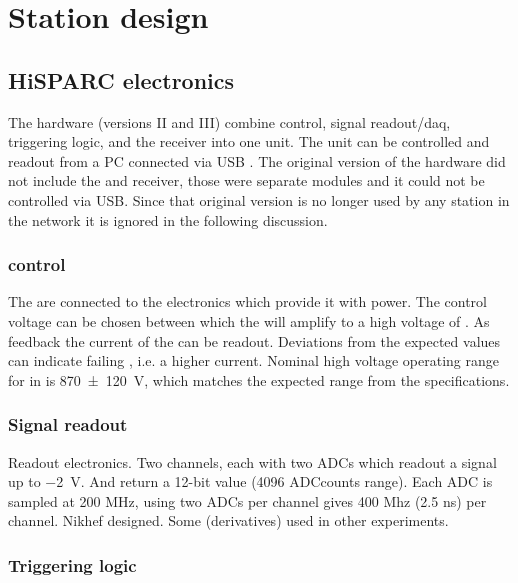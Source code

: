\section{Station design}

\subsection{HiSPARC electronics}

The \hisparc hardware (versions II and III) combine \pmt control, signal
readout/daq, triggering logic, and the \gps receiver into one unit. The
unit can be controlled and readout from a PC connected via USB
\cite{messages}. The original version of the \hisparc hardware did not
include the \daq and \gps receiver, those were separate modules and it
could not be controlled via USB. Since that original version is no
longer used by any station in the network it is ignored in the following
discussion.


\subsubsection{\pmt control}

The \pmts are connected to the \hisparc electronics which provide it with power. The control voltage can be chosen between  which the \pmt will amplify to a high voltage of . As feedback the current of the \pmt can be readout. Deviations from the expected values can indicate failing \pmts, i.e. a higher current. Nominal high voltage operating range for \pmts in \hisparc is \SI{870\pm120}{\volt}, which matches the expected range from the \pmt specifications.


\subsubsection{Signal readout}

Readout electronics. Two channels, each with two ADCs which readout a
signal up to \SI{-2}{\volt}. And return a 12-bit value (4096 ADCcounts
range). Each ADC is sampled at 200 MHz, using two ADCs per channel gives
400 Mhz (2.5 ns) per channel. Nikhef designed. Some (derivatives) used
in other experiments.


\subsubsection{Triggering logic}

